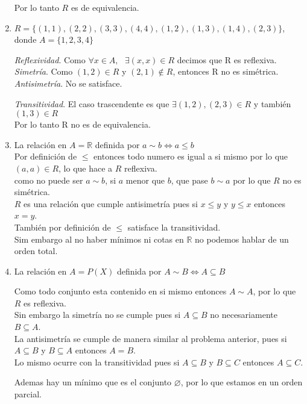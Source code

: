 \documentclass[12pt]{article}
\begin{document}
\begin{enumerate}[label=\alph*)]
    Por lo tanto $R$ es de equivalencia.

    \item $R = \{(1,1),(2,2),(3,3),(4,4),(1,2),(1,3),(1,4),(2,3)\}$, donde $A = \{1,2,3,4\}$

    \textit{Reflexividad}. Como $\forall x \in A, \text{ } \exists (x,x) \in R$ decimos que R es reflexiva.\\ 

    \textit{Simetría}. Como $(1,2) \in R$  y $(2,1) \notin R$, entonces R no es simétrica.\\

    \textit{Antisimetría}. No se satisface.

    \textit{Transitividad}. El caso trascendente es que $\exists (1,2), (2,3) \in R$ y también $(1,3) \in R$\\

    Por lo tanto R no es de equivalencia.\\

    \item La relación en $A = \mathbb{R}$ definida por $a \sim b \Longleftrightarrow a \leq b$\\

    Por definición de $\leq$ entonces todo numero es igual a si mismo por lo que $(a,a) \in R$, lo que hace a $R$ reflexiva.\\
    
    como no puede ser $a \sim b$, si $a$ menor que $b$, que pase $b \sim a$ por lo que $R$ no es simétrica.\\

    $R$ es una relación que cumple antisimetría pues si $x \leq y$ y $y \leq x$ entonces $x = y$.\\

    También por definición de $\leq$ satisface la transitividad.\\

    Sim embargo al no haber mínimos ni cotas en $\mathbb{R}$ no podemos hablar de un orden total.

    \item La relación en $A = P(X)$ definida por $A \sim B \Longleftrightarrow A \subseteq B$

    Como todo conjunto esta contenido en si mismo entonces $A \sim A$, por lo que $R$ es reflexiva.\\

    Sin embargo la simetría no se cumple pues si $A \subseteq B$ no necesariamente $B \subseteq A$.\\

    La antisimetría se cumple de manera similar al problema anterior, pues si  $A \subseteq B$ y $B \subseteq A$ entonces $A = B$.\\

    Lo mismo ocurre con la transitividad pues si $A \subseteq B$ y $B \subseteq C$ entonces $A \subseteq C$.

    Ademas hay un mínimo que es el conjunto $\varnothing$, por lo que estamos en un orden parcial.
\end{enumerate}
\end{document}
